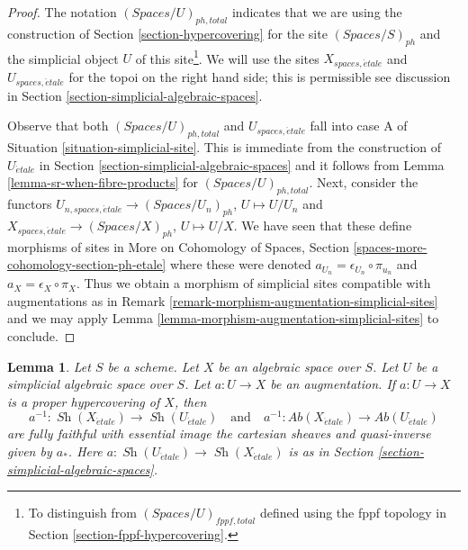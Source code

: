 \documentclass{stacks-project}
\theoremstyle{plain}
\newtheorem{lemma}[subsection]{Lemma}
\theoremstyle{definition}
\theoremstyle{remark}
\numberwithin{equation}{subsection}
\def\Sh{\mathop{\mathit{Sh}}\nolimits}
\def\etale{{\acute{e}tale}}
\begin{document}
\begin{proof}
The notation $(\textit{Spaces}/U)_{ph, total}$ indicates that
we are using the construction of
Section \ref{section-hypercovering}
for the site $(\textit{Spaces}/S)_{ph}$ and the
simplicial object $U$ of this site\footnote{To distinguish from
$(\textit{Spaces}/U)_{fppf, total}$ defined using the fppf
topology in Section \ref{section-fppf-hypercovering}.}.
We will use the sites $X_{spaces, \etale}$ and $U_{spaces, \etale}$
for the topoi on the right hand side; this is permissible
see discussion in Section \ref{section-simplicial-algebraic-spaces}.

\medskip\noindent
Observe that both $(\textit{Spaces}/U)_{ph, total}$ and
$U_{spaces, \etale}$
fall into case A of Situation \ref{situation-simplicial-site}.
This is immediate from the construction of
$U_\etale$ in Section \ref{section-simplicial-algebraic-spaces}
and it follows from Lemma \ref{lemma-sr-when-fibre-products}
for $(\textit{Spaces}/U)_{ph, total}$.
Next, consider the functors
$U_{n, spaces, \etale} \to (\textit{Spaces}/U_n)_{ph}$, $U \mapsto U/U_n$
and
$X_{spaces, \etale} \to (\textit{Spaces}/X)_{ph}$, $U \mapsto U/X$.
We have seen that these define morphisms of sites in
More on Cohomology of Spaces, Section
\ref{spaces-more-cohomology-section-ph-etale}
where these were denoted $a_{U_n} = \epsilon_{U_n} \circ \pi_{u_n}$
and $a_X = \epsilon_X \circ \pi_X$.
Thus we obtain a morphism of simplicial sites compatible with
augmentations as in Remark \ref{remark-morphism-augmentation-simplicial-sites}
and we may apply
Lemma \ref{lemma-morphism-augmentation-simplicial-sites} to conclude.
\end{proof}

\begin{lemma}
\label{lemma-descent-sheaves-for-ph-hypercovering}
Let $S$ be a scheme. Let $X$ be an algebraic space over $S$.
Let $U$ be a simplicial algebraic space over $S$. Let $a : U \to X$
be an augmentation. If $a : U \to X$ is a proper hypercovering of $X$,
then
$$
a^{-1} : \Sh(X_\etale) \to \Sh(U_\etale)
\quad\text{and}\quad
a^{-1} : \textit{Ab}(X_\etale) \to \textit{Ab}(U_\etale)
$$
are fully faithful with essential image the cartesian sheaves and
quasi-inverse given by $a_*$. Here $a : \Sh(U_\etale) \to \Sh(X_\etale)$
is as in Section \ref{section-simplicial-algebraic-spaces}.
\end{lemma}
\end{document}
